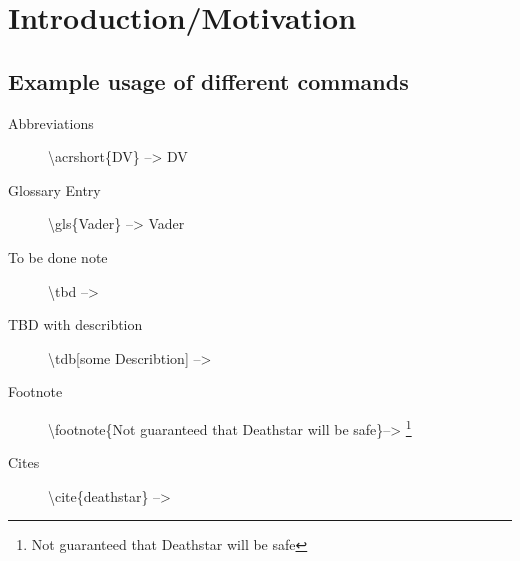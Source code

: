 \chapter{Introduction/Motivation}
\section{Example usage of different commands}


 \begin{description}
	\item[Abbreviations] \textbackslash acrshort\{DV\} -->  \acrshort{DV}
	\item[Glossary Entry] \textbackslash gls\{Vader\} -->  \gls{Vader}
	\item[To be done note] \textbackslash tbd --> \tbd
	\item[TBD with describtion] \textbackslash tdb[some Describtion] --> 
	\item[Footnote] \textbackslash footnote\{Not guaranteed that Deathstar will be safe\}--> \footnote{Not guaranteed that Deathstar will be safe}
	\item[Cites] \textbackslash cite\{deathstar\} --> \cite{deathstar}
 \end{description}



